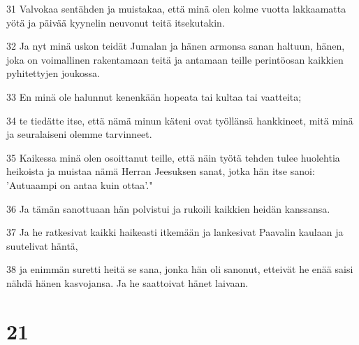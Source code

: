 \par 31 Valvokaa sentähden ja muistakaa, että minä olen kolme vuotta lakkaamatta yötä ja päivää kyynelin neuvonut teitä itsekutakin.
\par 32 Ja nyt minä uskon teidät Jumalan ja hänen armonsa sanan haltuun, hänen, joka on voimallinen rakentamaan teitä ja antamaan teille perintöosan kaikkien pyhitettyjen joukossa.
\par 33 En minä ole halunnut kenenkään hopeata tai kultaa tai vaatteita;
\par 34 te tiedätte itse, että nämä minun käteni ovat työllänsä hankkineet, mitä minä ja seuralaiseni olemme tarvinneet.
\par 35 Kaikessa minä olen osoittanut teille, että näin työtä tehden tulee huolehtia heikoista ja muistaa nämä Herran Jeesuksen sanat, jotka hän itse sanoi: 'Autuaampi on antaa kuin ottaa'."
\par 36 Ja tämän sanottuaan hän polvistui ja rukoili kaikkien heidän kanssansa.
\par 37 Ja he ratkesivat kaikki haikeasti itkemään ja lankesivat Paavalin kaulaan ja suutelivat häntä,
\par 38 ja enimmän suretti heitä se sana, jonka hän oli sanonut, etteivät he enää saisi nähdä hänen kasvojansa. Ja he saattoivat hänet laivaan.

\chapter{21}

